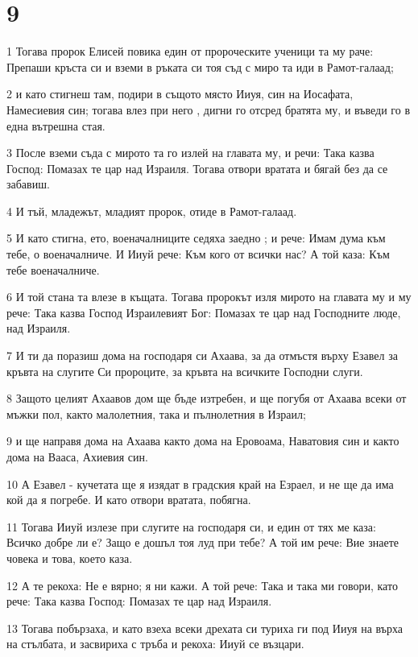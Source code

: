 \chapter{9}

\par 1 Тогава пророк Елисей повика един от пророческите ученици та му раче: Препаши кръста си и вземи в ръката си тоя съд с миро та иди в Рамот-галаад;
\par 2 и като стигнеш там, подири в същото място Ииуя, син на Иосафата, Намесиевия син; тогава влез при него , дигни го отсред братята му, и въведи го в една вътрешна стая.
\par 3 После вземи съда с мирото та го излей на главата му, и речи: Така казва Господ: Помазах те цар над Израиля. Тогава отвори вратата и бягай без да се забавиш.
\par 4 И тъй, младежът, младият пророк, отиде в Рамот-галаад.
\par 5 И като стигна, ето, военачалниците седяха заедно ; и рече: Имам дума към тебе, о военачалниче. И Ииуй рече: Към кого от всички нас? А той каза: Към тебе военачалниче.
\par 6 И той стана та влезе в къщата. Тогава пророкът изля мирото на главата му и му рече: Така казва Господ Израилевият Бог: Помазах те цар над Господните люде, над Израиля.
\par 7 И ти да поразиш дома на господаря си Ахаава, за да отмъстя върху Езавел за кръвта на слугите Си пророците, за кръвта на всичките Господни слуги.
\par 8 Защото целият Ахаавов дом ще бъде изтребен, и ще погубя от Ахаава всеки от мъжки пол, както малолетния, така и пълнолетния в Израил;
\par 9 и ще направя дома на Ахаава както дома на Еровоама, Наватовия син и както дома на Вааса, Ахиевия син.
\par 10 А Езавел - кучетата ще я изядат в градския край на Езраел, и не ще да има кой да я погребе. И като отвори вратата, побягна.
\par 11 Тогава Ииуй излезе при слугите на господаря си, и един от тях ме каза: Всичко добре ли е? Защо е дошъл тоя луд при тебе? А той им рече: Вие знаете човека и това, което каза.
\par 12 А те рекоха: Не е вярно; я ни кажи. А той рече: Така и така ми говори, като рече: Така казва Господ: Помазах те цар над Израиля.
\par 13 Тогава побързаха, и като взеха всеки дрехата си туриха ги под Ииуя на върха на стълбата, и засвириха с тръба и рекоха: Ииуй се възцари.
